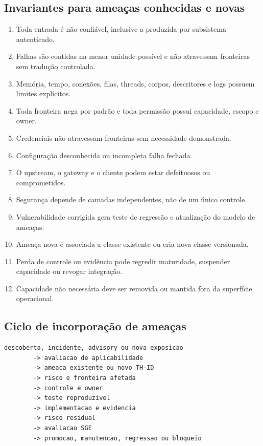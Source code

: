 \documentclass[11pt,a4paper,oneside]{article}
\begin{document}
\subsection{Invariantes para ameaças conhecidas e novas}
\begin{enumerate}
  \item Toda entrada é não confiável, inclusive a produzida por subsistema autenticado.
  \item Falhas são contidas na menor unidade possível e não atravessam fronteiras sem tradução controlada.
  \item Memória, tempo, conexões, filas, threads, corpos, descritores e logs possuem limites explícitos.
  \item Toda fronteira nega por padrão e toda permissão possui capacidade, escopo e owner.
  \item Credenciais não atravessam fronteiras sem necessidade demonstrada.
  \item Configuração desconhecida ou incompleta falha fechada.
  \item O upstream, o gateway e o cliente podem estar defeituosos ou comprometidos.
  \item Segurança depende de camadas independentes, não de um único controle.
  \item Vulnerabilidade corrigida gera teste de regressão e atualização do modelo de ameaças.
  \item Ameaça nova é associada a classe existente ou cria nova classe versionada.
  \item Perda de controle ou evidência pode regredir maturidade, suspender capacidade ou revogar integração.
  \item Capacidade não necessária deve ser removida ou mantida fora da superfície operacional.
\end{enumerate}

\subsection{Ciclo de incorporação de ameaças}
\begin{lstlisting}
descoberta, incidente, advisory ou nova exposicao
        -> avaliacao de aplicabilidade
        -> ameaca existente ou novo TH-ID
        -> risco e fronteira afetada
        -> controle e owner
        -> teste reproduzivel
        -> implementacao e evidencia
        -> risco residual
        -> avaliacao SGE
        -> promocao, manutencao, regressao ou bloqueio
\end{lstlisting}
\end{document}
